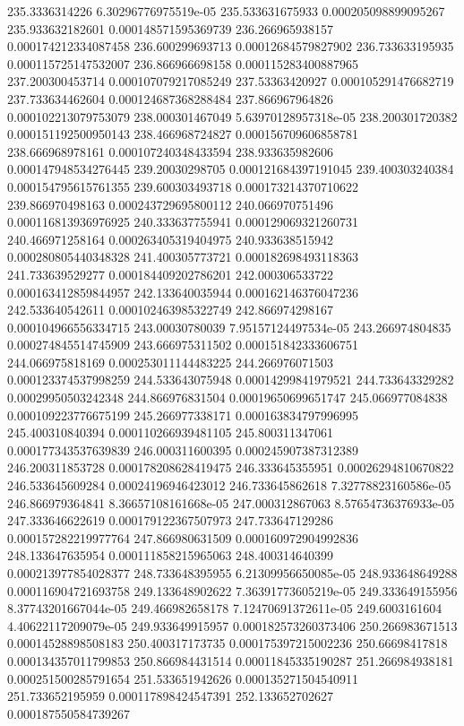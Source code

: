 {235.3336314226 6.30296776975519e-05
235.533631675933 0.000205098899095267
235.933632182601 0.000148571595369739
236.266965938157 0.000174212334087458
236.600299693713 0.00012684579827902
236.733633195935 0.000115725147532007
236.866966698158 0.000115283400887965
237.200300453714 0.000107079217085249
237.53363420927 0.000105291476682719
237.733634462604 0.000124687368288484
237.866967964826 0.000102213079753079
238.000301467049 5.63970128957318e-05
238.200301720382 0.000151192500950143
238.466968724827 0.000156709606858781
238.666968978161 0.000107240348433594
238.933635982606 0.000147948534276445
239.20030298705 0.000121684397191045
239.400303240384 0.000154795615761355
239.600303493718 0.000173214370710622
239.866970498163 0.000243729695800112
240.066970751496 0.000116813936976925
240.333637755941 0.000129069321260731
240.466971258164 0.000263405319404975
240.933638515942 0.000280805440348328
241.400305773721 0.000182698493118363
241.733639529277 0.000184409202786201
242.000306533722 0.000163412859844957
242.133640035944 0.000162146376047236
242.533640542611 0.000102463985322749
242.866974298167 0.000104966556334715
243.00030780039 7.95157124497534e-05
243.266974804835 0.000274845514745909
243.666975311502 0.000151842333606751
244.066975818169 0.000253011144483225
244.266976071503 0.000123374537998259
244.533643075948 0.00014299841979521
244.733643329282 0.00029950503242348
244.866976831504 0.00019650699651747
245.066977084838 0.000109223776675199
245.266977338171 0.000163834797996995
245.400310840394 0.000110266939481105
245.800311347061 0.000177343537639839
246.000311600395 0.000245907387312389
246.200311853728 0.000178208628419475
246.333645355951 0.00026294810670822
246.533645609284 0.00024196946423012
246.733645862618 7.32778823160586e-05
246.866979364841 8.36657108161668e-05
247.000312867063 8.57654736376933e-05
247.333646622619 0.000179122367507973
247.733647129286 0.000157282219977764
247.866980631509 0.000160972904992836
248.133647635954 0.000111858215965063
248.400314640399 0.000213977854028377
248.733648395955 6.21309956650085e-05
248.933648649288 0.000116904721693758
249.133648902622 7.36391773605219e-05
249.333649155956 8.37743201667044e-05
249.466982658178 7.12470691372611e-05
249.6003161604 4.40622117209079e-05
249.933649915957 0.000182573260373406
250.266983671513 0.00014528898508183
250.400317173735 0.000175397215002236
250.66698417818 0.000134357011799853
250.866984431514 0.00011845335190287
251.266984938181 0.000251500285791654
251.533651942626 0.000135271504540911
251.733652195959 0.000117898424547391
252.133652702627 0.000187550584739267
}
